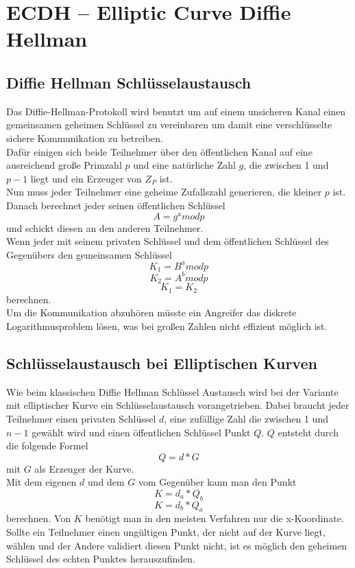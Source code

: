 \chapter{ECDH – Elliptic Curve Diffie Hellman}
\section{Diffie Hellman Schlüsselaustausch}
Das Diffie-Hellman-Protokoll wird benutzt um auf einem unsicheren Kanal einen gemeinsamen geheimen Schlüssel zu vereinbaren um damit eine verschlüsselte sichere Kommunikation zu betreiben.\\
Dafür einigen sich beide Teilnehmer über den öffentlichen Kanal auf eine ausreichend große Primzahl \(p\) und eine natürliche Zahl \(g\), die zwischen 1 und \(p-1\) liegt und ein Erzeuger von \(Z_P\) ist.\\
Nun muss jeder Teilnehmer eine geheime Zufallszahl generieren, die kleiner \(p\) ist. Danach berechnet jeder seinen öffentlichen Schlüssel \[A = g^a mod p\] und schickt diesen an den anderen Teilnehmer.\\
Wenn jeder mit seinem privaten Schlüssel und dem öffentlichen Schlüssel des Gegenübers den gemeinsamen Schlüssel \[K_1 = B^a mod p\] \[K_2 = A^b mod p\] \[K_1 = K_2\] berechnen.\\
Um die Kommunikation abzuhören müsste ein Angreifer das diskrete Logarithmusproblem lösen, was bei großen Zahlen nicht effizient möglich ist.

\section{Schlüsselaustausch bei Elliptischen Kurven}
Wie beim klassischen Diffie Hellman Schlüssel Austausch wird bei der Variante mit elliptischer Kurve ein Schlüsselaustausch vorangetrieben. Dabei braucht jeder Teilnehmer einen privaten Schlüssel \(d\), eine zufällige Zahl die zwischen 1 und \(n-1\) gewählt wird und einen öffentlichen Schlüssel Punkt \(Q\). \(Q\) entsteht durch die folgende Formel \[ Q = d * G\] mit \(G\) als Erzeuger der Kurve.\\ 
Mit dem eigenen \(d\) und dem \(G\) vom Gegenüber kann man den Punkt \[K = d_a * Q_b\] \[K = d_b * Q_a\] berechnen. Von \(K\) benötigt man in den meisten Verfahren nur die x-Koordinate.\\
Sollte ein Teilnehmer einen ungültigen Punkt, der nicht auf der Kurve liegt, wählen und der Andere validiert diesen Punkt nicht, ist es möglich den geheimen Schlüssel des echten Punktes herauszufinden.